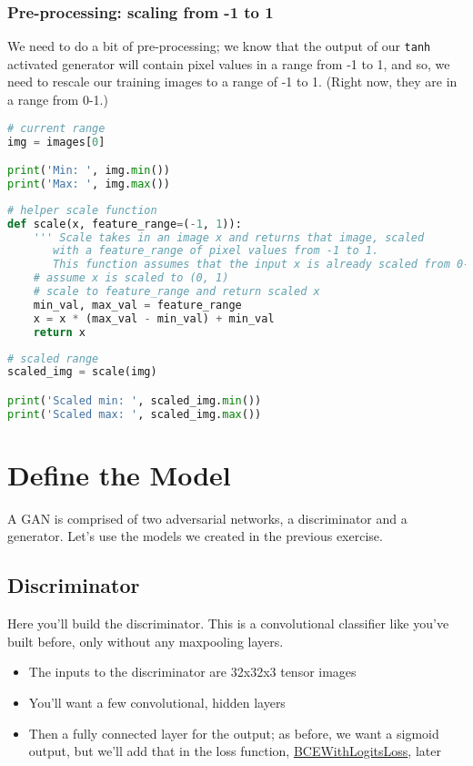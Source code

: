 \subsubsection{Pre-processing: scaling from -1 to 1}

We need to do a bit of pre-processing; we know that the output of our
\lstinline{tanh} activated generator will contain pixel
values in a range from -1 to 1, and so, we need to rescale our training
images to a range of -1 to 1. (Right now, they are in a range from 0-1.)

\begin{lstlisting}[language=Python]
# current range
img = images[0]

print('Min: ', img.min())
print('Max: ', img.max())
\end{lstlisting}

\begin{lstlisting}[language=Python]
# helper scale function
def scale(x, feature_range=(-1, 1)):
    ''' Scale takes in an image x and returns that image, scaled
       with a feature_range of pixel values from -1 to 1. 
       This function assumes that the input x is already scaled from 0-1.'''
    # assume x is scaled to (0, 1)
    # scale to feature_range and return scaled x
    min_val, max_val = feature_range
    x = x * (max_val - min_val) + min_val
    return x
\end{lstlisting}

\begin{lstlisting}[language=Python]
# scaled range
scaled_img = scale(img)

print('Scaled min: ', scaled_img.min())
print('Scaled max: ', scaled_img.max())
\end{lstlisting}

\section{Define the Model}

A GAN is comprised of two adversarial networks, a discriminator and a
generator. Let's use the models we created in the previous exercise.

\subsection{Discriminator}

Here you'll build the discriminator. This is a convolutional classifier
like you've built before, only without any maxpooling layers. 
\begin{itemize}
    \item The inputs to the discriminator are 32x32x3 tensor images
    \item You'll want a few convolutional, hidden layers
    \item Then a fully connected layer for the output; as before, we want a sigmoid output, but we'll add that in the loss function, \href{https://pytorch.org/docs/stable/nn.html\#bcewithlogitsloss}{BCEWithLogitsLoss}, later
\end{itemize}

